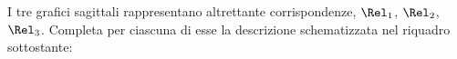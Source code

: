 \pagebreak
\begin{esercizio}
\label{ese:\thechapter.53}
I tre grafici sagittali rappresentano altrettante corrispondenze, $\Rel_1$, $\Rel_2$, $\Rel_3$.
Completa per ciascuna di esse la descrizione schematizzata nel riquadro sottostante:
\begin{center}
 
\end{center}
\end{esercizio}